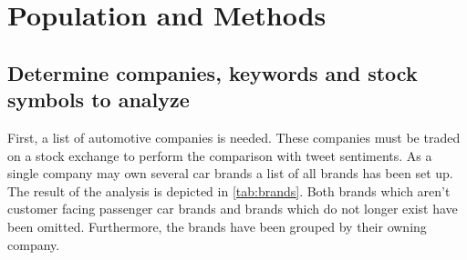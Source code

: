 \section{Population and Methods}

\subsection{Determine companies, keywords and stock symbols to analyze}

First, a list of automotive companies is needed.
These companies must be traded on a stock exchange to perform the comparison with tweet sentiments.
As a single company may own several car brands a list of all brands has been set up.
The result of the analysis is depicted in \autoref{tab:brands}.
Both brands which aren't customer facing passenger car brands and brands which do not longer exist have been omitted.
Furthermore, the brands have been grouped by their owning company.

